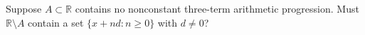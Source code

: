 Suppose $A\subset\mathbb R$ contains no nonconstant three-term arithmetic progression. Must $\mathbb R\setminus A$ contain a set $\{x+nd:n\ge0\}$ with $d\ne0$?

